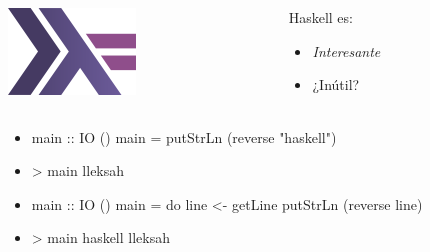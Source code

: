 \documentclass[spanish]{beamer}
\begin{document}

\begin{frame}
  \begin{columns}[onlytextwidth,T]
    \begin{column}{.5\textwidth}
      \begin{center}
        \includegraphics[scale=0.8]{haskell.png}
      \end{center}
    \end{column}
    \begin{column}{.5\textwidth}
      Haskell es:
      \begin{itemize}
      \item<1-> \emph{Interesante}
      \item<2-> ¿\alert{Inútil}?
      \end{itemize}
    \end{column}
  \end{columns}
\end{frame}


\begin{frame}[fragile]
  \begin{itemize}
  \item
    \begin{code}
main :: IO ()
main = putStrLn (reverse "haskell")
    \end{code}
  \item
    \begin{code}
> main
lleksah
    \end{code}
  \end{itemize}
\end{frame}


\begin{frame}[fragile]
  \begin{itemize}
  \item
    \begin{code}
main :: IO ()
main = do
  line <- getLine
  putStrLn (reverse line)
    \end{code}
  \item
    \begin{code}
> main
haskell
lleksah
    \end{code}
  \end{itemize}
\end{frame}
\end{document}
